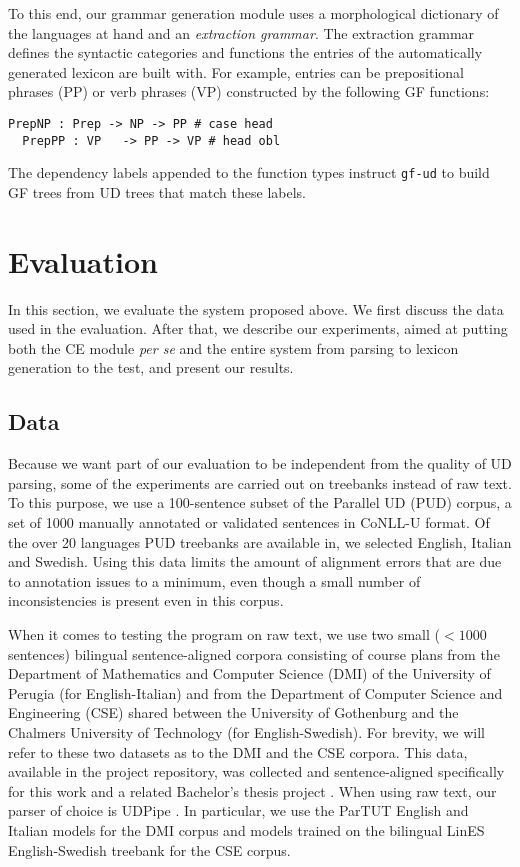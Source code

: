 \documentclass[11pt]{article}
\begin{document}
To this end, our grammar generation module uses a morphological dictionary of the languages at hand and an \textit{extraction grammar}. 
The extraction grammar defines the syntactic categories and functions the entries of the automatically generated lexicon are built with.
For example, entries can be prepositional phrases (PP) or verb phrases (VP) constructed by the following GF functions:

\begin{Verbatim}[fontsize=\small]
  PrepNP : Prep -> NP -> PP # case head
  PrepPP : VP   -> PP -> VP # head obl
\end{Verbatim}
The dependency labels appended to the function types instruct \texttt{gf-ud} to build GF trees from UD trees that match these labels.


\section{Evaluation} \label{evaluation}
In this section, we evaluate the system proposed above. 
We first discuss the data used in the evaluation. 
After that, we describe our experiments, aimed at putting both the CE module \textit{per se} and the entire system from parsing to lexicon generation to the test, and present our results.

\subsection{Data} \label{data}
Because we want part of our evaluation to be independent from the quality of UD parsing, some of the experiments are carried out on treebanks instead of raw text. 
To this purpose, we use a 100-sentence subset of the Parallel UD (PUD) corpus, a set of 1000 manually annotated or validated sentences in CoNLL-U format.
Of the over 20 languages PUD treebanks are available in, we selected English, Italian and Swedish. 
Using this data limits the amount of alignment errors that are due to annotation issues to a minimum, even though a small number of inconsistencies is present even in this corpus.

When it comes to testing the program on raw text, we use two small ($< 1000$ sentences) bilingual sentence-aligned corpora consisting of course plans from the Department of Mathematics and Computer Science (DMI) of the University of Perugia (for English-Italian) and from the Department of Computer Science and Engineering (CSE) shared between the University of Gothenburg and the Chalmers University of Technology (for English-Swedish). 
For brevity, we will refer to these two datasets as to the DMI and the CSE corpora.
This data, available in the project repository, was collected and sentence-aligned specifically for this work and a related Bachelor's thesis project \cite{thesis}.
When using raw text, our parser of choice is UDPipe \cite{straka-etal-2016-udpipe}. 
In particular, we use the ParTUT English and Italian models for the DMI corpus and models trained on the bilingual LinES English-Swedish treebank for the CSE corpus.
\end{document}
